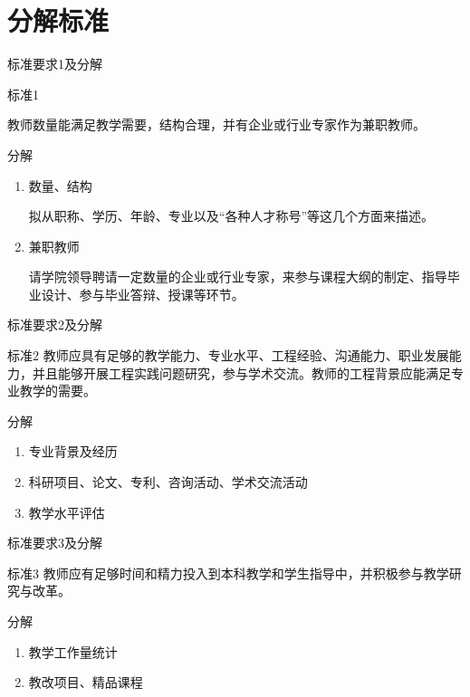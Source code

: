 \documentclass{beamer}
\begin{document}
\section{分解标准}
\begin{frame}{标准要求1及分解}
\begin{block}{标准1}

教师数量能满足教学需要，结构合理，并有企业或行业专家作为兼职教师。
\end{block}
\begin{block}{分解}
\begin{enumerate}
\item
数量、结构

拟从职称、学历、年龄、专业以及“各种人才称号”等这几个方面来描述。
\item
兼职教师

请学院领导聘请一定数量的企业或行业专家，来参与课程大纲的制定、指导毕业设计、参与毕业答辩、授课等环节。
\end{enumerate}
\end{block}
\end{frame}

\begin{frame}{标准要求2及分解}
\begin{block}{标准2}
教师应具有足够的教学能力、专业水平、工程经验、沟通能力、职业发展能力，并且能够开展工程实践问题研究，参与学术交流。教师的工程背景应能满足专业教学的需要。
\end{block}
\begin{block}{分解}
\begin{enumerate}
\item
专业背景及经历
\item
科研项目、论文、专利、咨询活动、学术交流活动
\item
教学水平评估
\end{enumerate}
\end{block}
\end{frame}

\begin{frame}{标准要求3及分解}
\begin{block}{标准3}
教师应有足够时间和精力投入到本科教学和学生指导中，并积极参与教学研究与改革。
\end{block}
\begin{block}{分解}
\begin{enumerate}
\item
教学工作量统计

\item
教改项目、精品课程
\end{enumerate}
\end{block}
\end{frame}
\end{document}
